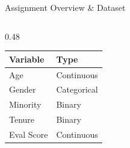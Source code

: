 \documentclass[aspectratio=169]{beamer}
\begin{document}
\begin{frame}{Assignment Overview \& Dataset}
\begin{columns}[T]
\begin{column}{0.48\textwidth}
            \begin{table}[h]
                \centering
                \scriptsize
                \begin{tabular}{ll}
                    \toprule
                    \textbf{Variable} & \textbf{Type} \\
                    \midrule
                    Age & Continuous \\
                    Gender & Categorical \\
                    Minority & Binary \\
                    Tenure & Binary \\
                    Eval Score & Continuous \\
                    \bottomrule
                \end{tabular}
            \end{table}
        \end{column}
    \end{columns}
\end{frame}
\end{document}
